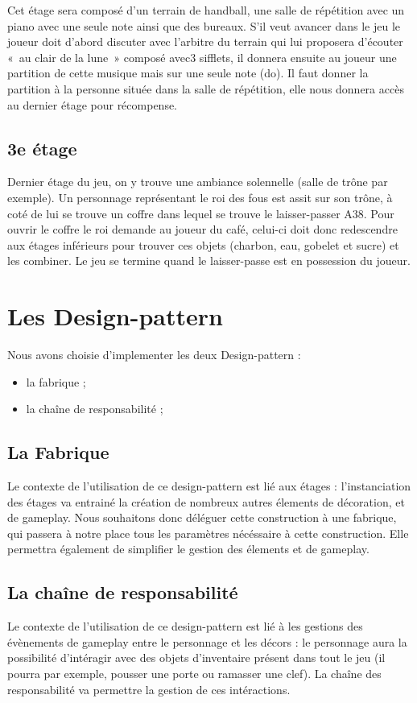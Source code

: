 \documentclass[a4paper,10pt]{article}
\begin{document}
Cet étage sera composé d'un terrain de handball, une salle de répétition avec un piano avec une seule note ainsi que des bureaux. S'il veut avancer dans le jeu le joueur doit d'abord discuter avec l'arbitre du terrain qui lui proposera d'écouter « au clair de la lune » composé avec3 sifflets, il donnera ensuite au joueur une partition de cette musique mais sur une seule note (do). Il faut donner la partition à la personne située dans la salle de répétition, elle nous donnera accès au dernier étage pour récompense.

\subsection{3e étage}

Dernier étage du jeu, on y trouve une ambiance solennelle (salle de trône par exemple). Un personnage représentant le roi des fous est assit sur son trône, à coté de lui se trouve un coffre dans lequel se trouve le laisser-passer A38. Pour ouvrir le coffre le roi demande au joueur du café, celui-ci doit donc redescendre aux étages inférieurs pour trouver ces objets (charbon, eau, gobelet et sucre) et les combiner. Le jeu se termine quand le laisser-passe est en possession du joueur.

\section{Les Design-pattern}

Nous avons choisie d'implementer les deux Design-pattern :
\begin{itemize}
 \item la fabrique ;
 \item la chaîne de responsabilité ;
\end{itemize}

\subsection{La Fabrique}

Le contexte de l'utilisation de ce design-pattern est lié aux étages : l'instanciation des étages va entrainé la création de nombreux autres élements de décoration, et de gameplay. Nous souhaitons donc déléguer cette construction à une fabrique, qui passera à notre place tous les paramètres nécéssaire à cette construction. Elle permettra également de simplifier le gestion des élements et de gameplay.

\subsection{La chaîne de responsabilité}

Le contexte de l'utilisation de ce design-pattern est lié à les gestions des évènements de gameplay entre le personnage et les décors : le personnage aura la possibilité d'intéragir avec des objets d'inventaire présent dans tout le jeu (il pourra par exemple, pousser une porte ou ramasser une clef). La chaîne des responsabilité va permettre la gestion de ces intéractions.
\end{document}
